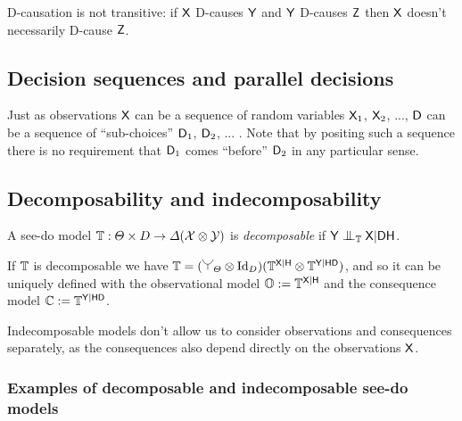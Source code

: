 D-causation is not transitive: if $\mathsf{X}$ D-causes $\mathsf{Y}$ and $\mathsf{Y}$ D-causes $\mathsf{Z}$ then $\mathsf{X}$ doesn't necessarily D-cause $\mathsf{Z}$.



\subsection{Decision sequences and parallel decisions}

Just as observations $\mathsf{X}$ can be a sequence of random variables $\mathsf{X}_1$, $\mathsf{X}_2$, ..., $\mathsf{D}$ can be a sequence of ``sub-choices'' $\mathsf{D}_1$, $\mathsf{D}_2$, ... . Note that by positing such a sequence there is no requirement that $\mathsf{D}_1$ comes ``before'' $\mathsf{D}_2$ in any particular sense.

\subsection{Decomposability and indecomposability}

\begin{definition}[decomposability]\label{def:decomposability}
A see-do model $\mathbb{T}:\Theta\times D\to \Delta(\mathcal{X}\otimes\mathcal{Y})$ is \emph{decomposable} if $\RV{Y}\CI_\kernel{T} \RV{X}|\RV{D}\RV{H}$. 

If $\mathbb{T}$ is decomposable we have $\kernel{T}=(\splitter{0.15}_{\Theta}\otimes \mathrm{Id}_D)(\kernel{T}^{\RV{X}|\RV{H}}\otimes\kernel{T}^{\RV{Y}|\RV{H}\RV{D}})$, and so it can be uniquely defined with the observational model $\mathbb{O}:= \mathbb{T}^{\mathsf{X}|\mathsf{H}}$ and the consequence model $\mathbb{C}:=\mathbb{T}^{\mathsf{Y}|\mathsf{H}\mathsf{D}}$.

\end{definition}

Indecomposable models don't allow us to consider observations and consequences separately, as the consequences also depend directly on the observations $\mathsf{X}$.


\subsubsection{Examples of decomposable and indecomposable see-do models}

